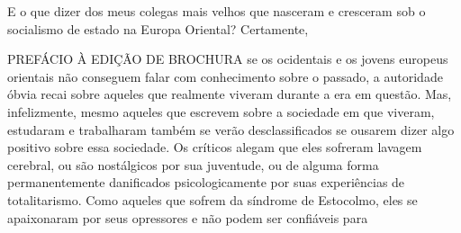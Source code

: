  \par 
E o que dizer dos meus colegas mais velhos que nasceram e cresceram sob o socialismo de estado na Europa Oriental? Certamente,
 \par 
PREFÁCIO À EDIÇÃO DE BROCHURA se os ocidentais e os jovens europeus orientais não conseguem falar com conhecimento sobre o passado, a autoridade óbvia recai sobre aqueles que realmente viveram durante a era em questão. Mas, infelizmente, mesmo aqueles que escrevem sobre a sociedade em que viveram, estudaram e trabalharam também se verão desclassificados se ousarem dizer algo positivo sobre essa sociedade. Os críticos alegam que eles sofreram lavagem cerebral, ou são nostálgicos por sua juventude, ou de alguma forma permanentemente danificados psicologicamente por suas experiências de totalitarismo. Como aqueles que sofrem da síndrome de Estocolmo, eles se apaixonaram por seus opressores e não podem ser confiáveis ​​para
 \par 
